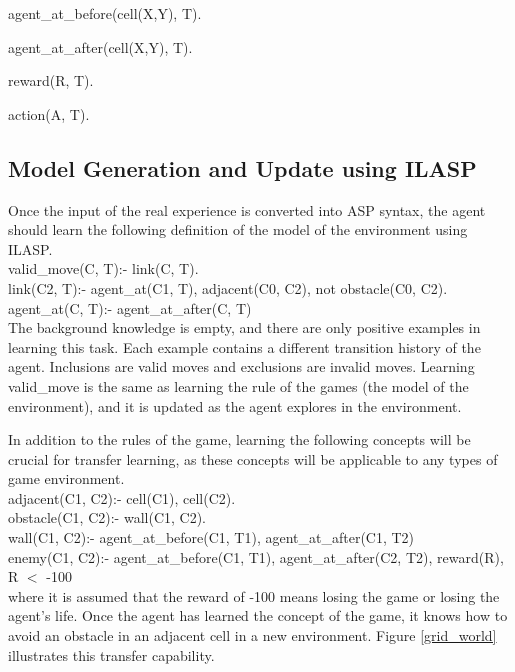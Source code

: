 \documentclass[12pt,twoside]{report}
\begin{document}
agent\_at\_before(cell(X,Y), T).

agent\_at\_after(cell(X,Y), T).

reward(R, T).

action(A, T).

\subsection{Model Generation and Update using ILASP}

Once the input of the real experience is converted into ASP syntax, the agent should learn the following definition of the model of the environment using ILASP. \\

valid\_move(C, T):- link(C, T).
\\
link(C2, T):- agent\_at(C1, T), adjacent(C0, C2), not obstacle(C0, C2).\\
agent\_at(C, T):- agent\_at\_after(C, T) \\

The background knowledge is empty, and there are only positive examples in learning this task. Each example contains a different transition history of the agent. Inclusions are valid moves and exclusions are invalid moves. Learning valid\_move is the same as learning the rule of the games (the model of the environment), and it is updated as the agent explores in the environment.

In addition to the rules of the game, learning the following concepts will be crucial for transfer learning, as these concepts will be applicable to any types of game environment.  \\

adjacent(C1, C2):- cell(C1), cell(C2). \\
obstacle(C1, C2):- wall(C1, C2). \\
wall(C1, C2):- agent\_at\_before(C1, T1), agent\_at\_after(C1, T2) \\
enemy(C1, C2):- agent\_at\_before(C1, T1), agent\_at\_after(C2, T2), reward(R), R $<$ -100 \\

where it is assumed that the reward of -100 means losing the game or losing the agent's life. Once the agent has learned the concept of the game, it knows how to avoid an obstacle in an adjacent cell in a new environment. Figure \ref{grid_world} illustrates this transfer capability.
\end{document}
